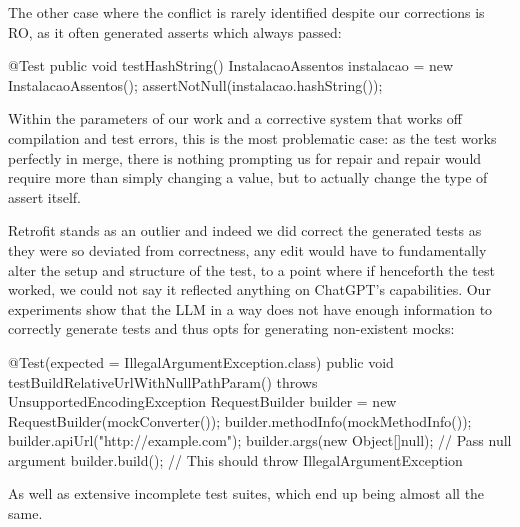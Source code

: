 The other case where the conflict is rarely identified despite our corrections is RO, as it often generated asserts which always passed:
\begin{response}
@Test
public void testHashString() {
    InstalacaoAssentos instalacao = new InstalacaoAssentos();
    assertNotNull(instalacao.hashString());
}
\end{response}
Within the parameters of our work and a corrective system that works off compilation and test errors, this is the most problematic case: as the test works perfectly in merge,
there is nothing prompting us for repair and repair would require more than simply changing a value, but to actually change the type of assert itself.

Retrofit stands as an outlier and indeed we did correct the generated tests as they were so deviated from correctness, any edit would have to fundamentally alter the setup and structure of the test,
to a point where if henceforth the test worked, we could not say it reflected anything on ChatGPT's capabilities.
Our experiments show that the LLM in a way does not have enough information to correctly generate tests and thus opts for generating non-existent mocks:
\begin{response}
@Test(expected = IllegalArgumentException.class)
public void testBuildRelativeUrlWithNullPathParam() throws UnsupportedEncodingException {
    RequestBuilder builder = new RequestBuilder(mockConverter());
    builder.methodInfo(mockMethodInfo());
    builder.apiUrl("http://example.com");
    builder.args(new Object[]{null}); // Pass null argument
    builder.build(); // This should throw IllegalArgumentException
}
\end{response}
As well as extensive incomplete test suites, which end up being almost all the same.

